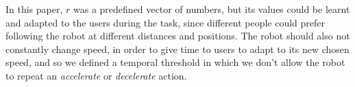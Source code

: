 


In this paper, $r$ was a predefined vector of numbers, but its values could be learnt and adapted to the users during the task, since different people could prefer following the robot at different distances and positions.
The robot should also not constantly change speed, in order to give time to users to adapt to its new chosen speed, and so we defined a temporal threshold in which we don't allow the robot to repeat an \textit{accelerate} or \textit{decelerate} action.

